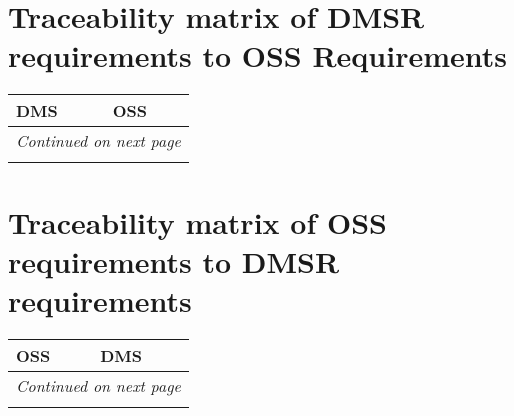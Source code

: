\newpage
\section{Traceability matrix of DMSR requirements to OSS Requirements \label{sect:tracefor}}
\begin{small}
	\begin{longtable}[htb]{|p{}|p{}|} \hline \textbf{DMS} & \textbf{OSS} \\ \hline
\endhead
\hline \multicolumn{2}{r}{\emph{Continued on next page}} \\
\endfoot
\hline\hline
\endlastfoot


\hline
\end{longtable}
\end{small}

\newpage
\section{Traceability matrix of OSS requirements  to DMSR requirements \label{sect:traceback}}

\begin{small}
	\begin{longtable}[htb]{|p{}|p{}|} \hline \textbf{OSS} & \textbf{DMS} \\ \hline
\endhead
\hline \multicolumn{2}{r}{\emph{Continued on next page}} \\
\endfoot
\hline\hline
\endlastfoot



\hline
\end{longtable}
\end{small}
